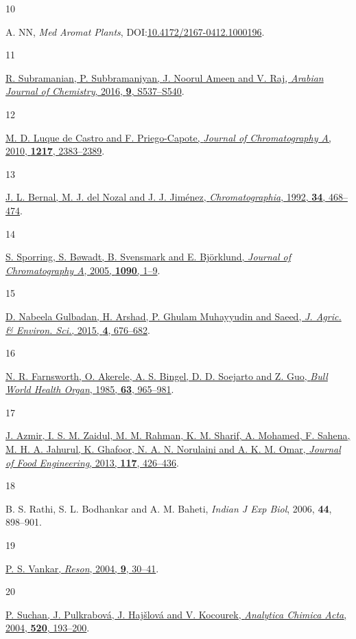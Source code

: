 \documentclass[
  twocolumn,
  landscape]{report}
\newlength{\cslhangindent}
\newlength{\csllabelwidth}
\newenvironment{CSLReferences}[2] %
 {\begin{list}{}{%
  \setlength{\itemindent}{0pt}
  \setlength{\leftmargin}{0pt}
  \setlength{\parsep}{0pt}
  \ifodd #1
   \setlength{\leftmargin}{\cslhangindent}
   \setlength{\itemindent}{-1\cslhangindent}
  \fi
  \setlength{\itemsep}{#2\baselineskip}}}
 {\end{list}}
\newcommand{\CSLLeftMargin}[1]{\parbox[t]{\csllabelwidth}{\strut#1\strut}}
\newcommand{\CSLRightInline}[1]{\parbox[t]{\linewidth - \csllabelwidth}{\strut#1\strut}}
\begin{document}
\begin{CSLReferences}{0}{0}
\CSLLeftMargin{10 }%
\CSLRightInline{A. NN, \emph{Med Aromat Plants},
DOI:\href{https://doi.org/10.4172/2167-0412.1000196}{10.4172/2167-0412.1000196}.}

\CSLLeftMargin{11 }%
\CSLRightInline{\href{https://doi.org/10.1016/j.arabjc.2011.06.022}{R.
Subramanian, P. Subbramaniyan, J. Noorul Ameen and V. Raj, \emph{Arabian
Journal of Chemistry}, 2016, \textbf{9}, S537--S540}.}

\CSLLeftMargin{12 }%
\CSLRightInline{\href{https://doi.org/10.1016/j.chroma.2009.11.027}{M.
D. Luque de Castro and F. Priego-Capote, \emph{Journal of Chromatography
A}, 2010, \textbf{1217}, 2383--2389}.}

\CSLLeftMargin{13 }%
\CSLRightInline{\href{https://doi.org/10.1007/BF02290238}{J. L. Bernal,
M. J. del Nozal and J. J. Jiménez, \emph{Chromatographia}, 1992,
\textbf{34}, 468--474}.}

\CSLLeftMargin{14 }%
\CSLRightInline{\href{https://doi.org/10.1016/j.chroma.2005.07.008}{S.
Sporring, S. Bøwadt, B. Svensmark and E. Björklund, \emph{Journal of
Chromatography A}, 2005, \textbf{1090}, 1--9}.}

\CSLLeftMargin{15 }%
\CSLRightInline{\href{https://doi.org/10.5829/idosi.aejaes.2015.15.4.12604}{D.
Nabeela Gulbadan, H. Arshad, P. Ghulam Muhayyudin and Saeed, \emph{J.
Agric. \& Environ. Sci.}, 2015, \textbf{4}, 676--682}.}

\CSLLeftMargin{16 }%
\CSLRightInline{\href{https://www.ncbi.nlm.nih.gov/pmc/articles/PMC2536466}{N.
R. Farnsworth, O. Akerele, A. S. Bingel, D. D. Soejarto and Z. Guo,
\emph{Bull World Health Organ}, 1985, \textbf{63}, 965--981}.}

\CSLLeftMargin{17 }%
\CSLRightInline{\href{https://doi.org/10.1016/j.jfoodeng.2013.01.014}{J.
Azmir, I. S. M. Zaidul, M. M. Rahman, K. M. Sharif, A. Mohamed, F.
Sahena, M. H. A. Jahurul, K. Ghafoor, N. A. N. Norulaini and A. K. M.
Omar, \emph{Journal of Food Engineering}, 2013, \textbf{117},
426--436}.}

\CSLLeftMargin{18 }%
\CSLRightInline{B. S. Rathi, S. L. Bodhankar and A. M. Baheti,
\emph{Indian J Exp Biol}, 2006, \textbf{44}, 898--901.}

\CSLLeftMargin{19 }%
\CSLRightInline{\href{https://doi.org/10.1007/BF02834854}{P. S. Vankar,
\emph{Reson}, 2004, \textbf{9}, 30--41}.}

\CSLLeftMargin{20 }%
\CSLRightInline{\href{https://doi.org/10.1016/j.aca.2004.02.061}{P.
Suchan, J. Pulkrabová, J. Hajšlová and V. Kocourek, \emph{Analytica
Chimica Acta}, 2004, \textbf{520}, 193--200}.}

\end{CSLReferences}
\end{document}

